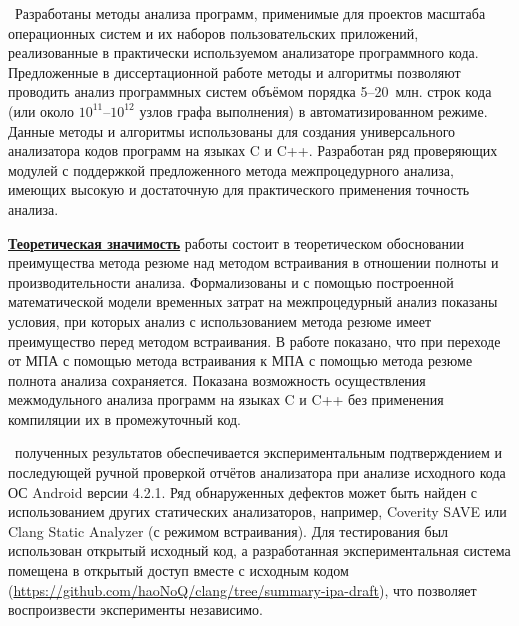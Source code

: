\influence\ Разработаны методы анализа программ, применимые для проектов масштаба операционных систем и их наборов пользовательских приложений, реализованные в практически используемом анализаторе программного кода. Предложенные в диссертационной работе методы и алгоритмы позволяют проводить анализ программных систем объёмом порядка 5--20~млн. строк кода (или около $10^{11}$--$10^{12}$ узлов графа выполнения) в автоматизированном режиме. Данные методы и алгоритмы использованы для создания универсального анализатора кодов программ на языках C и C++. Разработан ряд проверяющих модулей с поддержкой предложенного метода межпроцедурного анализа, имеющих высокую и достаточную для практического применения точность анализа.

\underline{\textbf{Теоретическая значимость}} работы состоит в теоретическом обосновании преимущества метода резюме над методом встраивания в отношении полноты и производительности анализа. Формализованы и с помощью построенной математической модели временных затрат на межпроцедурный анализ показаны условия, при которых анализ с использованием метода резюме имеет преимущество перед методом встраивания. В работе показано, что при переходе от МПА с помощью метода встраивания к МПА с помощью метода резюме полнота анализа сохраняется. Показана возможность осуществления межмодульного анализа программ на языках C и C++ без применения компиляции их в промежуточный код.

\reliability\ полученных результатов обеспечивается экспериментальным подтверждением и последующей ручной проверкой отчётов анализатора при анализе исходного кода ОС Android версии 4.2.1. Ряд обнаруженных дефектов может быть найден с использованием других статических анализаторов, например, Coverity SAVE или Clang Static Analyzer (с режимом встраивания). Для тестирования был использован открытый исходный код, а разработанная экспериментальная система помещена в открытый доступ вместе с исходным кодом ({\small\url{https://github.com/haoNoQ/clang/tree/summary-ipa-draft}}), что позволяет воспроизвести эксперименты независимо.

